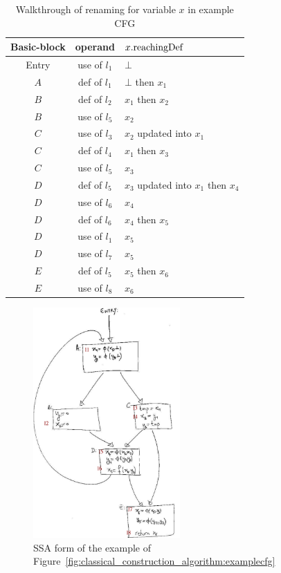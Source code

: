 \begin{table}
\begin{tabular}{c|c|l}
Basic-block & operand &  $x.\mathrm{reachingDef}$ \\ \hline
Entry & use of $l_1$ & $\bot$\\
$A$ & def of $l_1$ &  $\bot$ then $x_1$\\
$B$ & def of $l_2$ &  $x_1$ then $x_2$\\
$B$ & use of $l_5$ & $x_2$\\
$C$ & use of $l_3$ & $x_2$ updated into $x_1$\\
$C$ & def of $l_4$ &  $x_1$ then $x_3$\\
$C$ & use of $l_5$ & $x_3$\\
$D$ & def of $l_5$ & $x_3$ updated into $x_1$ then $x_4$\\
$D$ & use of $l_6$ & $x_4$\\
$D$ & def of $l_6$ & $x_4$ then $x_5$\\
$D$ & use of $l_1$ & $x_5$\\
$D$ & use of $l_7$ & $x_5$\\
$E$ & def of $l_5$ & $x_5$ then $x_6$\\
$E$ & use of $l_8$ & $x_6$
\end{tabular}
\caption{\label{table:classical_construction_algorithm:renaming}Walkthrough of renaming for variable $x$ in example CFG}
\end{table}

\begin{figure}
\includegraphics[width=0.5\textwidth]{renaming_label.pdf}
\caption{\label{fig:classical_construction_algorithm:renaming} SSA form of the example of Figure~\ref{fig:classical_construction_algorithm:examplecfg}}
\end{figure}

